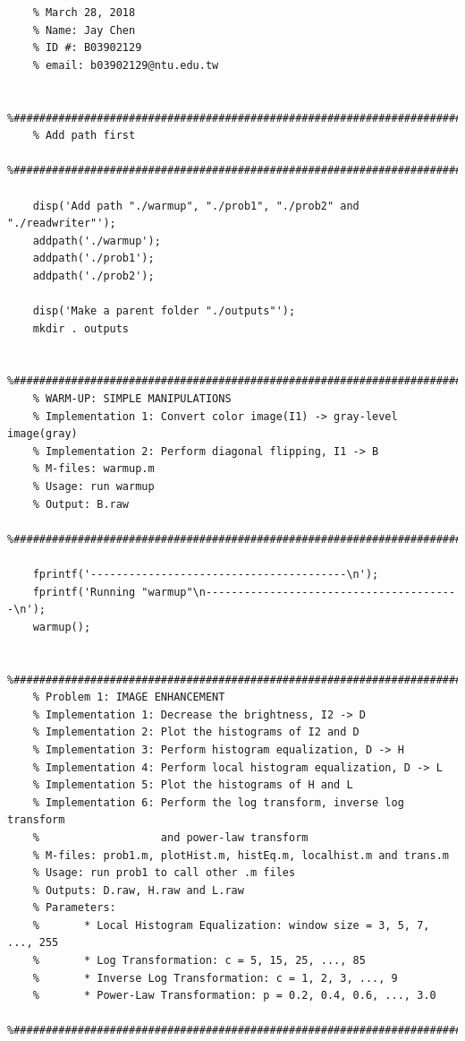\documentclass{article}
\begin{document}
\begin{lstlisting}[caption = {README.m}]
    % DIP Homework Assignment #1 
    % March 28, 2018
    % Name: Jay Chen
    % ID #: B03902129 
    % email: b03902129@ntu.edu.tw
    
    %#########################################################################
    % Add path first
    %#########################################################################
    
    disp('Add path "./warmup", "./prob1", "./prob2" and "./readwriter"');
    addpath('./warmup');
    addpath('./prob1');
    addpath('./prob2');
    
    disp('Make a parent folder "./outputs"');
    mkdir . outputs
    
    %######################################################################### 
    % WARM-UP: SIMPLE MANIPULATIONS                                           
    % Implementation 1: Convert color image(I1) -> gray-level image(gray)     
    % Implementation 2: Perform diagonal flipping, I1 -> B                    
    % M-files: warmup.m   
    % Usage: run warmup
    % Output: B.raw
    %#########################################################################
    
    fprintf('----------------------------------------\n');
    fprintf('Running "warmup"\n----------------------------------------\n');
    warmup();
    
    %######################################################################### 
    % Problem 1: IMAGE ENHANCEMENT                                            
    % Implementation 1: Decrease the brightness, I2 -> D                      
    % Implementation 2: Plot the histograms of I2 and D
    % Implementation 3: Perform histogram equalization, D -> H
    % Implementation 4: Perform local histogram equalization, D -> L
    % Implementation 5: Plot the histograms of H and L
    % Implementation 6: Perform the log transform, inverse log transform 
    %                   and power-law transform
    % M-files: prob1.m, plotHist.m, histEq.m, localhist.m and trans.m
    % Usage: run prob1 to call other .m files
    % Outputs: D.raw, H.raw and L.raw
    % Parameters:
    %       * Local Histogram Equalization: window size = 3, 5, 7, ..., 255
    %       * Log Transformation: c = 5, 15, 25, ..., 85
    %       * Inverse Log Transformation: c = 1, 2, 3, ..., 9
    %       * Power-Law Transformation: p = 0.2, 0.4, 0.6, ..., 3.0
    %#########################################################################
    

\end{lstlisting}
\end{document}
